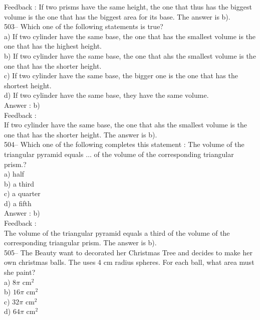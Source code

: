 \documentclass[letterpaper, 12pt]{article}
\begin{document}
Feedback :
If two prisms have the same height, the one that thus has the biggest volume is the one that has the biggest area for its base. The answer is
b).\\

503-- Which one of the following statements is true? \\
a) If two cylinder have the same base, the one that has the smallest volume is the one that has the highest height.\\
b) If two cylinder have the same base, the one that ahs the smallest volume is the one that has the shorter height.\\
c) If two cylinder have the same base, the bigger one is the one that has the shortest height.\\
d) If two cylinder have the same base, they have the same volume.\\

Answer : b)\\

Feedback :  \\
If two cylinder have the same base, the one that ahs the smallest volume is the one that has the shorter height.  The answer is b).\\

504-- Which one of the following completes this statement : \og The volume of the triangular pyramid equals $\ldots$ of the volume of the corresponding triangular prism.\fg?\\
a) half\\
b) a third\\
c) a quarter\\
d) a fifth\\

Answer : b)\\

Feedback :  \\
The volume of the triangular pyramid equals a third of the volume of the corresponding triangular prism.  The answer is b).\\

505-- The Beauty want to decorated her Christmas Tree and decides to make her own christmas balls. The uses 4 cm radius spheres. For each ball, what area must she paint?\\
a) $8\pi$ cm$^{2}$\\
b) $16\pi$ cm$^{2}$\\
c) $32\pi$ cm$^{2}$\\
d) $64\pi$ cm$^{2}$\\
\end{document}

